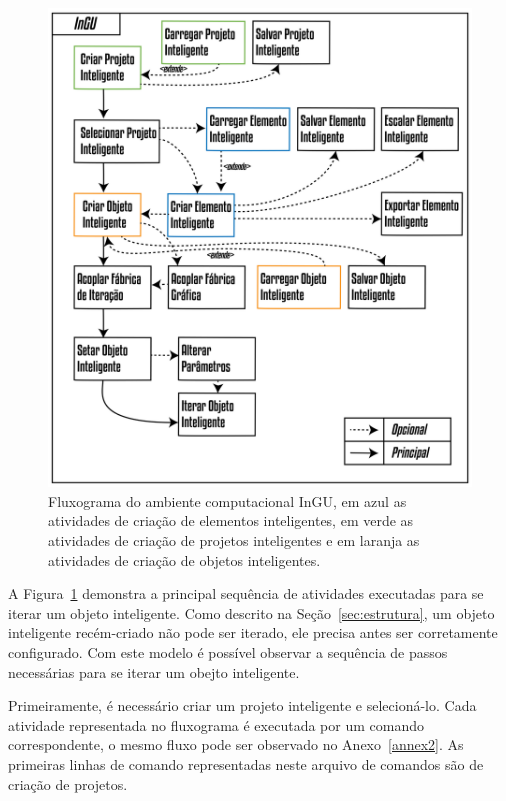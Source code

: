 \begin{figure}[!htbp]
	\centering
	\includegraphics[width=\linewidth]{Figures/CasoDeUso@16x.png}
	\caption{Fluxograma do ambiente computacional InGU, em azul as atividades de criação de elementos inteligentes, em verde as atividades de criação de projetos inteligentes e em laranja as atividades de criação de objetos inteligentes.}
	\label{fig:caso_uso}
\end{figure}

A Figura~\ref{fig:caso_uso} demonstra a principal sequência de atividades executadas para se iterar um objeto inteligente. Como descrito na Seção~\ref{sec:estrutura}, um objeto inteligente recém-criado não pode ser iterado, ele precisa antes ser corretamente configurado. Com este modelo é possível observar a sequência de passos necessárias para se iterar um obejto inteligente.

Primeiramente, é necessário criar um projeto inteligente e selecioná-lo. Cada atividade representada no fluxograma é executada por um comando correspondente, o mesmo fluxo pode ser observado no Anexo~\ref{annex2}. As primeiras linhas de comando representadas neste arquivo de comandos são de criação de projetos.

